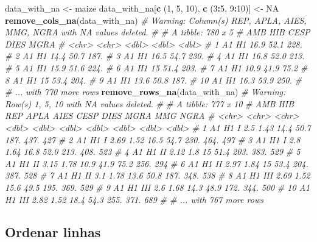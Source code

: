 \documentclass[
]{book}
\newenvironment{Shaded}{\begin{snugshade}}{\end{snugshade}}
\newcommand{\CommentTok}[1]{\textcolor[rgb]{0.56,0.35,0.01}{\textit{#1}}}
\newcommand{\DecValTok}[1]{\textcolor[rgb]{0.00,0.00,0.81}{#1}}
\newcommand{\KeywordTok}[1]{\textcolor[rgb]{0.13,0.29,0.53}{\textbf{#1}}}
\newcommand{\NormalTok}[1]{#1}
\newcommand{\OperatorTok}[1]{\textcolor[rgb]{0.81,0.36,0.00}{\textbf{#1}}}
\newcommand{\OtherTok}[1]{\textcolor[rgb]{0.56,0.35,0.01}{#1}}
\newcommand{\StringTok}[1]{\textcolor[rgb]{0.31,0.60,0.02}{#1}}
\begin{document}
\begin{Shaded}
\begin{Highlighting}[]
\NormalTok{data_with_na <-}\StringTok{ }\NormalTok{maize}
\NormalTok{data_with_na[}\KeywordTok{c}\NormalTok{ (}\DecValTok{1}\NormalTok{, }\DecValTok{5}\NormalTok{, }\DecValTok{10}\NormalTok{), }\KeywordTok{c}\NormalTok{ (}\DecValTok{3}\OperatorTok{:}\DecValTok{5}\NormalTok{, }\DecValTok{9}\OperatorTok{:}\DecValTok{10}\NormalTok{)] <-}\StringTok{ }\OtherTok{NA}
\KeywordTok{remove_cols_na}\NormalTok{(data_with_na)}
\CommentTok{# Warning: Column(s) REP, APLA, AIES, MMG, NGRA with NA values deleted.}
\CommentTok{# # A tibble: 780 x 5}
\CommentTok{#    AMB   HIB    CESP  DIES  MGRA}
\CommentTok{#    <chr> <chr> <dbl> <dbl> <dbl>}
\CommentTok{#  1 A1    H1     16.9  52.1 228. }
\CommentTok{#  2 A1    H1     14.4  50.7 187. }
\CommentTok{#  3 A1    H1     16.5  54.7 230. }
\CommentTok{#  4 A1    H1     16.8  52.0 213. }
\CommentTok{#  5 A1    H1     15.9  51.6 224. }
\CommentTok{#  6 A1    H1     15    51.4 203. }
\CommentTok{#  7 A1    H1     10.9  41.9  75.2}
\CommentTok{#  8 A1    H1     15    53.4 204. }
\CommentTok{#  9 A1    H1     13.6  50.8 187. }
\CommentTok{# 10 A1    H1     16.3  53.9 250. }
\CommentTok{# # ... with 770 more rows}
\KeywordTok{remove_rows_na}\NormalTok{(data_with_na)}
\CommentTok{# Warning: Row(s) 1, 5, 10 with NA values deleted.}
\CommentTok{# # A tibble: 777 x 10}
\CommentTok{#    AMB   HIB   REP    APLA  AIES  CESP  DIES  MGRA   MMG  NGRA}
\CommentTok{#    <chr> <chr> <chr> <dbl> <dbl> <dbl> <dbl> <dbl> <dbl> <dbl>}
\CommentTok{#  1 A1    H1    I      2.5   1.43  14.4  50.7 187.   437.   427}
\CommentTok{#  2 A1    H1    I      2.69  1.52  16.5  54.7 230.   464.   497}
\CommentTok{#  3 A1    H1    I      2.8   1.64  16.8  52.0 213.   408.   523}
\CommentTok{#  4 A1    H1    II     2.12  1.8   15    51.4 203.   383.   529}
\CommentTok{#  5 A1    H1    II     3.15  1.78  10.9  41.9  75.2  256.   294}
\CommentTok{#  6 A1    H1    II     2.97  1.84  15    53.4 204.   387.   528}
\CommentTok{#  7 A1    H1    II     3.1   1.78  13.6  50.8 187.   348.   538}
\CommentTok{#  8 A1    H1    III    2.69  1.52  15.6  49.5 195.   369.   529}
\CommentTok{#  9 A1    H1    III    2.6   1.68  14.3  48.9 172.   344.   500}
\CommentTok{# 10 A1    H1    III    2.82  1.52  18.4  54.3 255.   371.   689}
\CommentTok{# # ... with 767 more rows}
\end{Highlighting}
\end{Shaded}

\hypertarget{ordenar-linhas}{%
\subsection{Ordenar linhas}\label{ordenar-linhas}}
\end{document}
